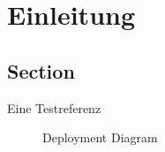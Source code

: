 \chapter{Einleitung}
\label{chapter:introduction}

\section{Section}
Eine Testreferenz ~\cite{latex}

\begin{figure}
    \centering
    
    \caption{Deployment Diagram}
    \label{fig:ss-deployment-diagram}
\end{figure}